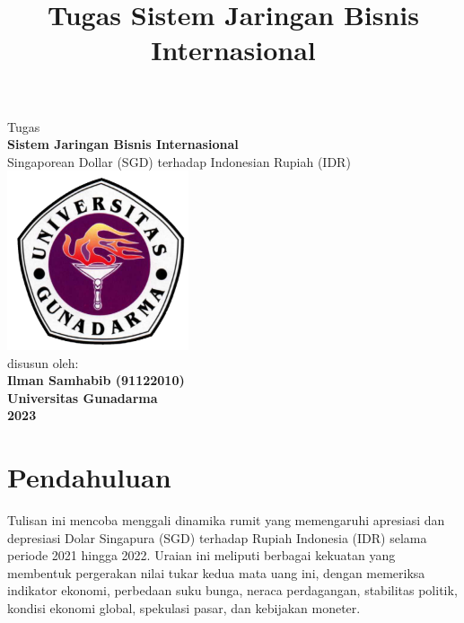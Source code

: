 \documentclass[12pt]{article}
\title{Tugas Sistem Jaringan Bisnis Internasional}
\begin{document}
\thispagestyle{empty}
\begin{center}
    Tugas\\
    \textbf{Sistem Jaringan Bisnis Internasional }\\
    Singaporean Dollar (SGD) terhadap Indonesian Rupiah (IDR)\\
    \vspace*{11\baselineskip}
    \includegraphics[width=0.4\textwidth,height=0.4\textwidth]{glogo}  \\
    \vspace*{11\baselineskip}
    disusun oleh:\\
    \textbf{Ilman Samhabib (91122010)}\\
    \textbf{Universitas Gunadarma}\\
    \textbf{2023}\\
\end{center}
\newpage

\section{Pendahuluan}


Tulisan ini mencoba menggali dinamika rumit yang memengaruhi apresiasi dan depresiasi Dolar Singapura (SGD) terhadap Rupiah Indonesia (IDR) selama periode 2021 hingga 2022. Uraian ini meliputi berbagai kekuatan yang membentuk pergerakan nilai tukar kedua mata uang ini, dengan memeriksa indikator ekonomi, perbedaan suku bunga, neraca perdagangan, stabilitas politik, kondisi ekonomi global, spekulasi pasar, dan kebijakan moneter.
\end{document}
